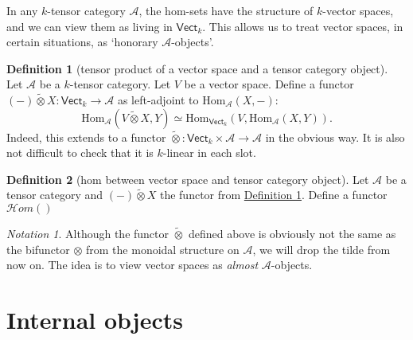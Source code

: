 \documentclass[a4paper,10pt]{scrreprt}
\newcommand{\Hom}{\mathrm{Hom}}
\theoremstyle{definition}
\newtheorem{definition}{Definition}[section]
\theoremstyle{plain}
\theoremstyle{remark}
\newtheorem{notation}{Notation}[section]
\begin{document}
In any $k$-tensor category $\mathscr{A}$, the hom-sets have the structure of $k$-vector spaces, and we can view them as living in $\mathsf{Vect}_{k}$. This allows us to treat vector spaces, in certain situations, as `honorary $\mathscr{A}$-objects'.
\begin{definition}[tensor product of a vector space and a tensor category object]
  \label{def:tensorproductofavectorspaceandatensorcategoryobject}
  Let $\mathscr{A}$ be a $k$-tensor category. Let $V$ be a vector space. Define a functor $(-) \tilde{\otimes} X\colon \mathsf{Vect}_{k} \to \mathscr{A}$ as left-adjoint to $\Hom_{\mathscr{A}}(X,-)$:
  \begin{equation*}
    \Hom_{\mathscr{A}}(V \tilde{\otimes} X, Y) \simeq \Hom_{\mathsf{Vect}_{k}}(V, \Hom_{\mathscr{A}}(X, Y)).
  \end{equation*}
  Indeed, this extends to a functor $\tilde{\otimes}\colon \mathsf{Vect}_{k} \times \mathscr{A} \to \mathscr{A}$ in the obvious way. It is also not difficult to check that it is $k$-linear in each slot.
\end{definition}

\begin{definition}[hom between vector space and tensor category object]
  \label{def:hombetweenvectorspaceandtensorcategoryobject}
  Let $\mathscr{A}$ be a tensor category and $(-) \tilde{\otimes} X$ the functor from \hyperref[def:tensorproductofavectorspaceandatensorcategoryobject]{Definition \ref*{def:tensorproductofavectorspaceandatensorcategoryobject}}. Define a functor $\mathscr{H}om()$
\end{definition}

\begin{notation}
  Although the functor $\tilde{\otimes}$ defined above is obviously not the same as the bifunctor $\otimes$ from the monoidal structure on $\mathscr{A}$, we will drop the tilde from now on. The idea is to view vector spaces as \emph{almost} $\mathscr{A}$-objects.
\end{notation}

\section{Internal objects}
\end{document}
